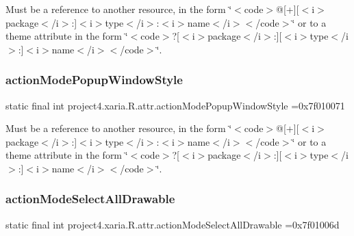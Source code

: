 Must be a reference to another resource, in the form \char`\"{}$<$code$>$@\mbox{[}+\mbox{]}\mbox{[}$<$i$>$package$<$/i$>$\+:\mbox{]}$<$i$>$type$<$/i$>$\+:$<$i$>$name$<$/i$>$$<$/code$>$\char`\"{} or to a theme attribute in the form \char`\"{}$<$code$>$?\mbox{[}$<$i$>$package$<$/i$>$\+:\mbox{]}\mbox{[}$<$i$>$type$<$/i$>$\+:\mbox{]}$<$i$>$name$<$/i$>$$<$/code$>$\char`\"{}. \mbox{\label{classproject4_1_1xaria_1_1R_1_1attr_a7b02c646c929a70e91aaefc13fd7eba2}} 
\subsubsection{\texorpdfstring{action\+Mode\+Popup\+Window\+Style}{actionModePopupWindowStyle}}
{\footnotesize\ttfamily static final int project4.\+xaria.\+R.\+attr.\+action\+Mode\+Popup\+Window\+Style =0x7f010071\hspace{0.3cm}{\ttfamily [static]}}

Must be a reference to another resource, in the form \char`\"{}$<$code$>$@\mbox{[}+\mbox{]}\mbox{[}$<$i$>$package$<$/i$>$\+:\mbox{]}$<$i$>$type$<$/i$>$\+:$<$i$>$name$<$/i$>$$<$/code$>$\char`\"{} or to a theme attribute in the form \char`\"{}$<$code$>$?\mbox{[}$<$i$>$package$<$/i$>$\+:\mbox{]}\mbox{[}$<$i$>$type$<$/i$>$\+:\mbox{]}$<$i$>$name$<$/i$>$$<$/code$>$\char`\"{}. \mbox{\label{classproject4_1_1xaria_1_1R_1_1attr_a733c23f5afc5d0af2ae987558473390a}} 
\subsubsection{\texorpdfstring{action\+Mode\+Select\+All\+Drawable}{actionModeSelectAllDrawable}}
{\footnotesize\ttfamily static final int project4.\+xaria.\+R.\+attr.\+action\+Mode\+Select\+All\+Drawable =0x7f01006d\hspace{0.3cm}{\ttfamily [static]}}

